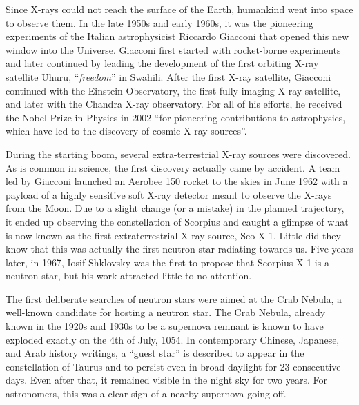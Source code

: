 Since X-rays could not reach the surface of the Earth, humankind went into space to observe them.
In the late 1950s and early 1960s, it was the pioneering experiments of the Italian astrophysicist Riccardo Giacconi that opened this new window into the Universe.
Giacconi first started with rocket-borne experiments and later continued by leading the development of the first orbiting X-ray satellite Uhuru, ``\textit{freedom}'' in Swahili.\cite{GGP62}
After the first X-ray satellite, Giacconi continued with the Einstein Observatory, the first fully imaging X-ray satellite, and later with the Chandra X-ray observatory.
For all of his efforts, he received the Nobel Prize in Physics in 2002 ``for pioneering contributions to astrophysics, which have led to the discovery of cosmic X-ray sources''.


During the starting boom, several extra-terrestrial X-ray sources were discovered.
As is common in science, the first discovery actually came by accident.
A team led by Giacconi launched an Aerobee 150 rocket to the skies in June 1962 with a payload of a highly sensitive soft X-ray detector meant to observe the X-rays from the Moon.
Due to a slight change (or a mistake) in the planned trajectory, it ended up observing the constellation of Scorpius and caught a glimpse of what is now known as the first extraterrestrial X-ray source, Sco X-1.
Little did they know that this was actually the first neutron star radiating towards us.
Five years later, in 1967, Iosif Shklovsky was the first to propose that Scorpius X-1 is a neutron star\cite{Shklovsky67}, but his work attracted little to no attention.

The first deliberate searches of neutron stars were aimed at the Crab Nebula, a well-known candidate for hosting a neutron star.
The Crab Nebula, already known in the 1920s and 1930s to be a supernova remnant is known to have exploded exactly on the 4th of July, 1054.\cite{Oort, Lundmark21, Mayall39, HistSupernovas}
In contemporary Chinese, Japanese, and Arab history writings, a ``guest star'' is described to appear in the constellation of Taurus and to persist even in broad daylight for 23 consecutive days.
Even after that, it remained visible in the night sky for two years.
For astronomers, this was a clear sign of a nearby supernova going off.


